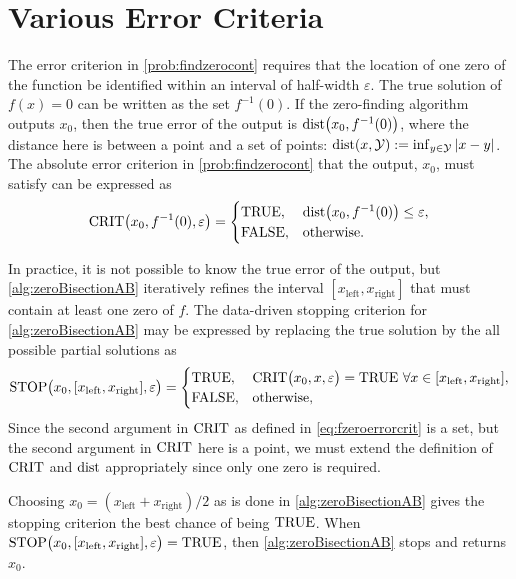 \chapter{Various Error Criteria} \label{chap:relerror}
The error criterion in \cref{prob:findzerocont} requires that the location of one zero of the function be identified within an interval of half-width $\varepsilon$.  The true solution of $f(x) = 0$ can be written as the set $f^{-1}(0)$.  If the zero-finding algorithm outputs $x_0$, then the true error of the output is $\operatorname{dist}\bigl(x_0,f^{-1}(0)\bigr)$, where the distance here is between a point and a set of points: $\operatorname{dist}(x,\mathcal{Y}) := \inf_{y \in \mathcal{Y}} \left \lvert x-y \right \rvert$. The absolute error criterion in \cref{prob:findzerocont} that the output, $x_0$, must satisfy can be expressed as 
\begin{equation} \label{eq:fzeroerrorcrit}
    \operatorname{CRIT}\bigl(x_0,f^{-1}(0),\varepsilon\bigr) = 
    \begin{cases} \textup{TRUE}, & \operatorname{dist}\bigl(x_0,f^{-1}(0)\bigr) \le \varepsilon,\\
    \textup{FALSE}, & \text{otherwise}.
    \end{cases}
\end{equation}

In practice, it is not possible to know the true error of the output, but \cref{alg:zeroBisectionAB} iteratively refines the interval $[x_{\text{left}}, x_{\text{right}}]$ that must contain at least one zero of $f$. 
The data-driven stopping criterion for \cref{alg:zeroBisectionAB} may be expressed by replacing the true solution by the all possible partial solutions as
\begin{equation}
    \operatorname{STOP}\bigl(x_0,[x_{\text{left}},x_{\text{right}}],\varepsilon\bigr) = 
    \begin{cases} \textup{TRUE}, & \operatorname{CRIT}\bigl(x_0,x,\varepsilon\bigr) = \textup{TRUE} \ \forall x \in [x_{\text{left}},x_{\text{right}}] ,\\
    \textup{FALSE}, & \text{otherwise},
    \end{cases}
\end{equation}
Since the second argument in $\operatorname{CRIT}$ as defined in \eqref{eq:fzeroerrorcrit} is a set, but the second argument in $\operatorname{CRIT}$ here is a point, we must extend the definition of $\operatorname{CRIT}$ and $\operatorname{dist}$ appropriately since only one zero is required.

Choosing $x_0 = (x_{\text{left}}+x_{\text{right}})/2$ as is done in \cref{alg:zeroBisectionAB} gives the stopping criterion the best chance of being $\textup{TRUE}$.  When $\operatorname{STOP}\bigl(x_0,[x_{\text{left}},x_{\text{right}}],\varepsilon\bigr) = \textup{TRUE}$, then \cref{alg:zeroBisectionAB} stops and returns $x_0$.

